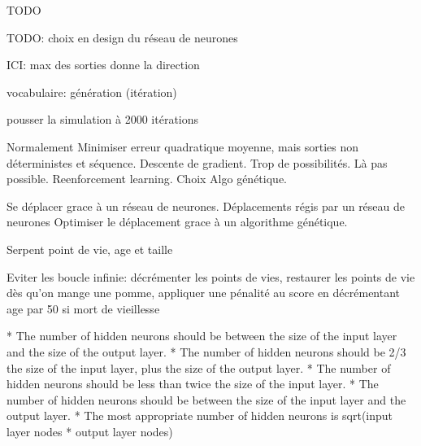 \documentclass[10pt]{beamer}
\begin{document}
\begin{frame}
TODO

TODO: choix en design du réseau de neurones

ICI: max des sorties donne la direction

vocabulaire: génération (itération)

pousser la simulation à 2000 itérations

Normalement Minimiser erreur quadratique moyenne, mais sorties non déterministes et séquence.
Descente de gradient.
Trop de possibilités.
Là pas possible.
Reenforcement learning.
Choix Algo génétique.

Se déplacer grace à un réseau de neurones.
Déplacements régis par un réseau de neurones
Optimiser le déplacement grace à un algorithme génétique.

Serpent point de vie, age et taille

Eviter les boucle infinie: décrémenter les points de vies, restaurer les points de vie dès qu'on mange une pomme, appliquer une pénalité au score en décrémentant age par 50 si mort de vieillesse

* The number of hidden neurons should be between the size of the input layer and the size of the output layer.
* The number of hidden neurons should be 2/3 the size of the input layer, plus the size of the output layer.
* The number of hidden neurons should be less than twice the size of the input layer.
* The number of hidden neurons should be between the size of the input layer and the output layer.
* The most appropriate number of hidden neurons is sqrt(input layer nodes * output layer nodes)
\end{frame}
\end{document}
